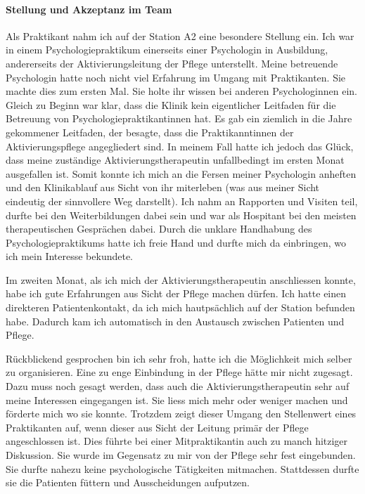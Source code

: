 \paragraph{Stellung und Akzeptanz im Team}
Als Praktikant nahm ich auf der Station A2 eine besondere Stellung ein. Ich war in einem Psychologiepraktikum einerseits einer Psychologin in Ausbildung, andererseits der Aktivierungsleitung der Pflege unterstellt. Meine betreuende Psychologin hatte noch nicht viel Erfahrung im Umgang mit Praktikanten. Sie machte dies zum ersten Mal. Sie holte ihr wissen bei anderen Psychologinnen ein. Gleich zu Beginn war klar, dass die Klinik kein eigentlicher Leitfaden für die Betreuung von Psychologiepraktikantinnen hat. Es gab ein ziemlich in die Jahre gekommener Leitfaden, der besagte, dass die Praktikanntinnen der Aktivierungspflege angegliedert sind. In meinem Fall hatte ich jedoch das Glück, dass meine zuständige Aktivierungstherapeutin unfallbedingt im ersten Monat ausgefallen ist. Somit konnte ich mich an die Fersen meiner Psychologin anheften und den Klinikablauf aus Sicht von ihr miterleben (was aus meiner Sicht eindeutig der sinnvollere Weg darstellt). Ich nahm an Rapporten und Visiten teil, durfte bei den Weiterbildungen dabei sein und war als Hospitant bei den meisten therapeutischen Gesprächen dabei. Durch die unklare Handhabung des Psychologiepraktikums hatte ich freie Hand und durfte mich da einbringen, wo ich mein Interesse bekundete. 

Im zweiten Monat, als ich mich der Aktivierungstherapeutin anschliessen konnte, habe ich gute Erfahrungen aus Sicht der Pflege machen dürfen. Ich hatte einen direkteren Patientenkontakt, da ich mich hautpsächlich auf der Station befunden habe. Dadurch kam ich automatisch in den Austausch zwischen Patienten und Pflege. 

Rückblickend gesprochen bin ich sehr froh, hatte ich die Möglichkeit mich selber zu organisieren. Eine zu enge Einbindung in der Pflege hätte mir nicht zugesagt. Dazu muss noch gesagt werden, dass auch die Aktivierungstherapeutin sehr auf meine Interessen eingegangen ist. Sie liess mich mehr oder weniger machen und förderte mich wo sie konnte. Trotzdem zeigt dieser Umgang den Stellenwert eines Praktikanten auf, wenn dieser aus Sicht der Leitung primär der Pflege angeschlossen ist. Dies führte bei einer Mitpraktikantin auch zu manch hitziger Diskussion. Sie wurde im Gegensatz zu mir von der Pflege sehr fest eingebunden. Sie durfte nahezu keine psychologische Tätigkeiten mitmachen. Stattdessen durfte sie die Patienten füttern und Ausscheidungen aufputzen. 

